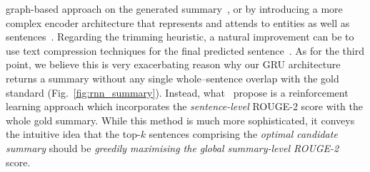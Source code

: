 \begin{itemize}
        graph-based approach on the generated summary~\cite{sonawane2016coreference}, or by introducing a more complex
        encoder architecture that represents and attends to entities as well as sentences~\cite{Huang2021ExtractiveSC}.
        Regarding the trimming heuristic, a natural improvement can be to use text compression techniques for the final predicted sentence~\cite{ghalandari2022efficient, KNIGHT200291}.
        As for the third point, we believe this is very exacerbating reason why our GRU architecture returns a summary
        without any single whole--sentence overlap with the gold standard (Fig.~\ref{fig:rnn_summary}).
        Instead, what~\cite{zmandar-etal-2021-joint} propose is a reinforcement learning approach which incorporates
        the \emph{sentence-level} ROUGE-2 score with the whole gold summary.
        While this method is much more sophisticated, it conveys the intuitive idea that the top-$k$ sentences comprising the
        \emph{optimal candidate summary} should be \emph{greedily maximising the global summary-level ROUGE-2} score.
\end{itemize}

